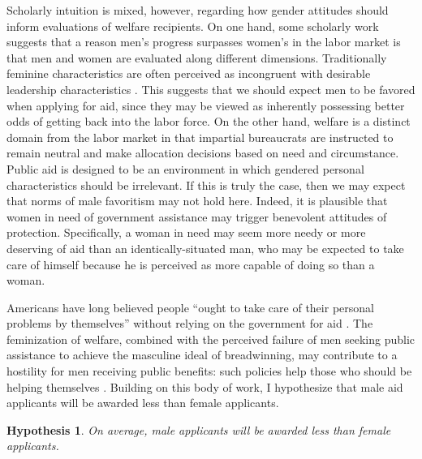 \documentclass[12pt]{article}%
\newtheorem{hypothesis}{Hypothesis}
\begin{document}
\begin{doublespace}
Scholarly intuition is mixed, however, regarding how gender attitudes should inform evaluations of welfare recipients. On one hand, some scholarly work suggests that a reason men’s progress surpasses women’s in the labor market is that men and women are evaluated along different dimensions. Traditionally feminine characteristics are often perceived as incongruent with desirable leadership characteristics \citep{eagly_role_2002}. This suggests that we should expect men to be favored when applying for aid, since they may be viewed as inherently possessing better odds of getting back into the labor force. On the other hand, welfare is a distinct domain from the labor market in that impartial bureaucrats are instructed to remain neutral and make allocation decisions based on need and circumstance. Public aid is designed to be an environment in which gendered personal characteristics should be irrelevant. If this is truly the case, then we may expect that norms of male favoritism may not hold here. Indeed, it is plausible that women in need of government assistance may trigger benevolent attitudes of protection. Specifically, a woman in need may seem more needy or more deserving of aid than an identically-situated man, who may be expected to take care of himself because he is perceived as more capable of doing so than a woman.


Americans have long believed people ``ought to take care of their personal problems by themselves” without relying on the government for aid \citep{sniderman_coping_1977}. The feminization of welfare, combined with the perceived failure of men seeking public assistance to achieve the masculine ideal of breadwinning, may contribute to a hostility for men receiving public benefits: such policies help those who should be helping themselves \citep{bobocel_justice-based_1998, katz_racial_1988, sniderman_symbolic_1986, sniderman_beyond_1996, mclosky_ethos}. Building on this body of work, I hypothesize that male aid applicants will be awarded less than female applicants.

\begin{hypothesis} \label{hyp:first}
	On average, male applicants will be awarded less than female applicants.
\end{hypothesis}


\end{doublespace}
\end{document}
